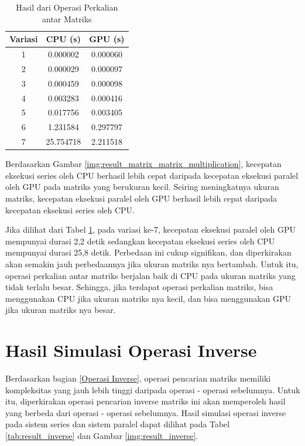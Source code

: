 \begin{table}[H]
	\centering
	\caption{Hasil dari Operasi Perkalian antar Matriks}
	\label{tab:result_matrix_matrix_multiplication}
	\begin{tabular}{ccc}
		\toprule
		Variasi & CPU (s)   & GPU (s)  \\
		\midrule
		1       & 0.000002  & 0.000060 \\
		2       & 0.000029  & 0.000097 \\
		3       & 0.000459  & 0.000098 \\
		4       & 0.003283  & 0.000416 \\
		5       & 0.017756  & 0.003405 \\
		6       & 1.231584  & 0.297797 \\
		7       & 25.754718 & 2.211518 \\
		\bottomrule
	\end{tabular}
\end{table}

Berdasarkan Gambar \ref{img:result_matrix_matrix_multiplication}, kecepatan eksekusi series oleh CPU berhasil lebih cepat daripada kecepatan eksekusi paralel oleh GPU pada matriks yang berukuran kecil. Seiring meningkatnya ukuran matriks, kecepatan eksekusi paralel oleh GPU berhasil lebih cepat daripada kecepatan eksekusi series oleh CPU.

Jika dilihat dari Tabel \ref{tab:result_matrix_matrix_multiplication}, pada variasi ke-7, kecepatan eksekusi paralel oleh GPU mempunyai durasi 2,2 detik sedangkan kecepatan eksekusi series oleh CPU mempunyai durasi 25,8 detik. Perbedaan ini cukup signifikan, dan diperkirakan akan semakin jauh perbedaannya jika ukuran matriks nya bertambah. Untuk itu, operasi perkalian antar matriks berjalan baik di CPU pada ukuran matriks yang tidak terlalu besar. Sehingga, jika terdapat operasi perkalian matriks, bisa menggunakan CPU jika ukuran matriks nya kecil, dan bisa menggunakan GPU jika ukuran matriks nya besar.

\section{Hasil Simulasi Operasi Inverse}

Berdasarkan bagian \ref{Operasi Inverse}, operasi pencarian matriks memiliki kompleksitas yang jauh lebih tinggi daripada operasi - operasi sebelumnya. Untuk itu, diperkirakan operasi pencarian inverse matriks ini akan memperoleh hasil yang berbeda dari operasi - operasi sebelumnya. Hasil simulasi operasi inverse pada sistem series dan sistem paralel dapat dilihat pada Tabel \ref{tab:result_inverse} dan Gambar \ref{img:result_inverse}.

